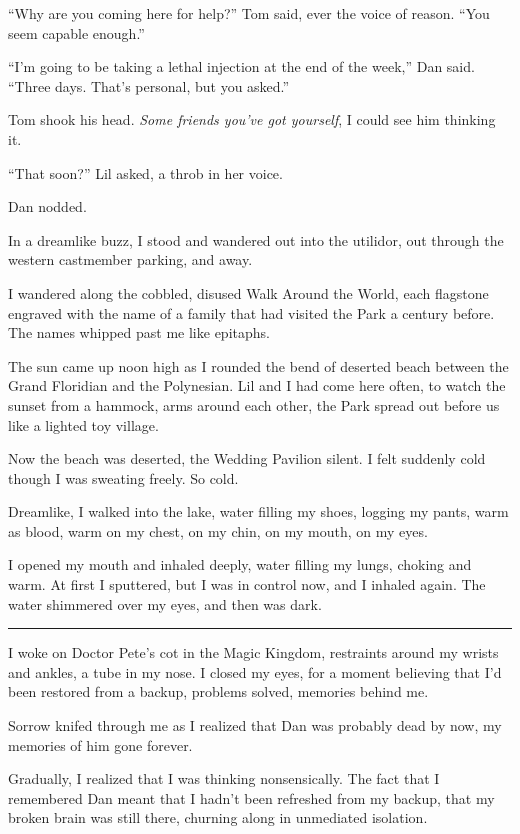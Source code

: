 “Why are you coming here for help?” Tom said, ever the voice of
reason. “You seem capable enough.”

“I'm going to be taking a lethal injection at the end of the week,”
Dan said. “Three days. That's personal, but you asked.”

Tom shook his head. \emph{Some friends you've got yourself}, I
could see him thinking it.

“That soon?” Lil asked, a throb in her voice.

Dan nodded.

In a dreamlike buzz, I stood and wandered out into the utilidor,
out through the western castmember parking, and away.

I wandered along the cobbled, disused Walk Around the World, each
flagstone engraved with the name of a family that had visited the
Park a century before. The names whipped past me like epitaphs.

The sun came up noon high as I rounded the bend of deserted beach
between the Grand Floridian and the Polynesian. Lil and I had come
here often, to watch the sunset from a hammock, arms around each
other, the Park spread out before us like a lighted toy village.

Now the beach was deserted, the Wedding Pavilion silent. I felt
suddenly cold though I was sweating freely. So cold.

Dreamlike, I walked into the lake, water filling my shoes, logging
my pants, warm as blood, warm on my chest, on my chin, on my mouth,
on my eyes.

I opened my mouth and inhaled deeply, water filling my lungs,
choking and warm. At first I sputtered, but I was in control now,
and I inhaled again. The water shimmered over my eyes, and then was
dark.

\begin{center}\rule{1in}{0.4pt}\end{center}

I woke on Doctor Pete's cot in the Magic Kingdom, restraints around
my wrists and ankles, a tube in my nose. I closed my eyes, for a
moment believing that I'd been restored from a backup, problems
solved, memories behind me.

Sorrow knifed through me as I realized that Dan was probably dead
by now, my memories of him gone forever.

Gradually, I realized that I was thinking nonsensically. The fact
that I remembered Dan meant that I hadn't been refreshed from my
backup, that my broken brain was still there, churning along in
unmediated isolation.

